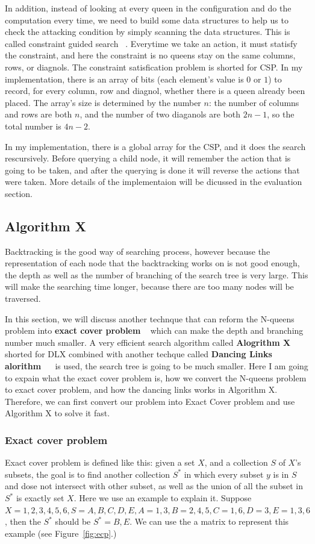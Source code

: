 In addition, instead of looking at every queen in the configuration and do the computation every time, we need to build some data structures to help us to check the attacking condition by simply scanning the data structures. This is called constraint guided search ~\cite{russell_modern_1995}. Everytime we take an action, it must statisfy the constraint, and here the constraint is no queens stay on the same columns, rows, or diagnols. The constraint satisfication problem is shorted for CSP. In my implementation, there is an array of bits (each element's value is $0$ or $1$) to record, for every column, row and diagnol, whether there is a queen already been placed. The array's size is determined by the number $n$: the number of columns and rows are both $n$, and the number of two diaganols are both $2n-1$, so the total number is $4n-2$.

In my implementation, there is a global array for the CSP, and it does the search rescursively. Before querying a child node, it will remember the action that is going to be taken, and after  the querying is done it will reverse the actions that were taken. More details of the implementaion will be dicussed in the evaluation section. 

\subsection{Algorithm X}
Backtracking is the good way of searching process, however because the representation of each node that the backtracking works on is not good enough, the depth as well as the number of branching of the search tree is very large. This will make the searching time longer, because there are too many nodes will be traversed.

In this section, we will discuss another technque that can reform the N-queens problem into \textbf{exact cover problem} ~\cite{noauthor_exact_2017} which can make the depth and branching number much smaller. A very efficient search algorithm called \textbf{Alogrithm X}   shorted for DLX combined with another techque called \textbf{Dancing Links alorithm} ~\cite{noauthor_knuths_2016}~\cite{knuth_dancing_2000} is used, the search tree is going to be much smaller. Here I am going to expain what the exact cover problem is, how we convert the N-queens problem to exact cover problem, and how the dancing links works in Algorithm X. Therefore, we can first convert our problem into Exact Cover problem and use Algorithm X to solve it fast.

\subsubsection{Exact cover problem}
Exact cover problem is defined like this: given a set $X$, and a collection $S$ of $X$'s subsets, the goal is to find another collection $S^*$ in which every subset $y$ is in $S$ and dose not intersect with other subset, as well as the union of all the subset in $S^*$ is exactly set $X$. Here we use an example to explain it. Suppose $X={1,2,3,4,5,6}, S={A, B, C, D, E}, A={1,3}, B={2,4, 5}, C={1, 6}, D={3},E={1, 3, 6}$, then the $S^*$ should be $S^*={B, E}$. We can use the a matrix to represent this example (see Figure~\ref{fig:ecp}.)

